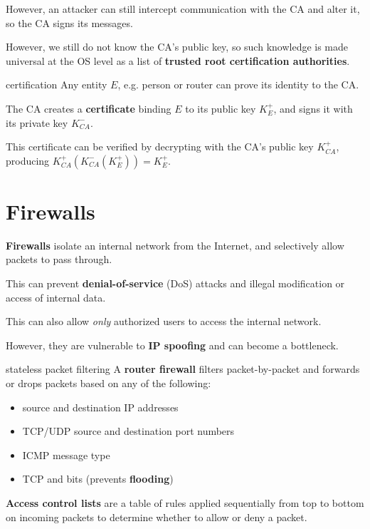 However, an attacker can still intercept communication with the CA and alter it,
so the CA signs its messages.

However, we still do not know the CA's public key, so such knowledge is made universal
at the OS level as a list of \textbf{trusted root certification authorities}.

\begin{defn}{certification}
    Any entity $E$, e.g. person or router can prove its identity to the CA.

    The CA creates a \textbf{certificate} binding $E$ to its public key $K_E^+$, and signs it with its private key $K_{CA}^-$.

    This certificate can be verified by decrypting with the CA's public key $K_{CA}^+$, producing $K_{CA}^+(K_{CA}^-(K_E^+)) = K_E^+$.
\end{defn}


\section{Firewalls}
\textbf{Firewalls} isolate an internal network from the Internet, and selectively allow
packets to pass through.

This can prevent \textbf{denial-of-service} (DoS) attacks and illegal modification or access
of internal data.

This can also allow \textit{only} authorized users to access the internal network.

However, they are vulnerable to \textbf{IP spoofing} and can become a bottleneck.

\begin{defn}{stateless packet filtering}
    A \textbf{router firewall} filters packet-by-packet and forwards or drops packets based on any of the following:
    \begin{itemize}
        \item source and destination IP addresses
        \item TCP/UDP source and destination port numbers
        \item ICMP message type
        \item TCP  and  bits (prevents \textbf{ flooding})
    \end{itemize}
\end{defn}

\textbf{Access control lists} are a table of rules applied sequentially from top to bottom on incoming packets
to determine whether to allow or deny a packet.
